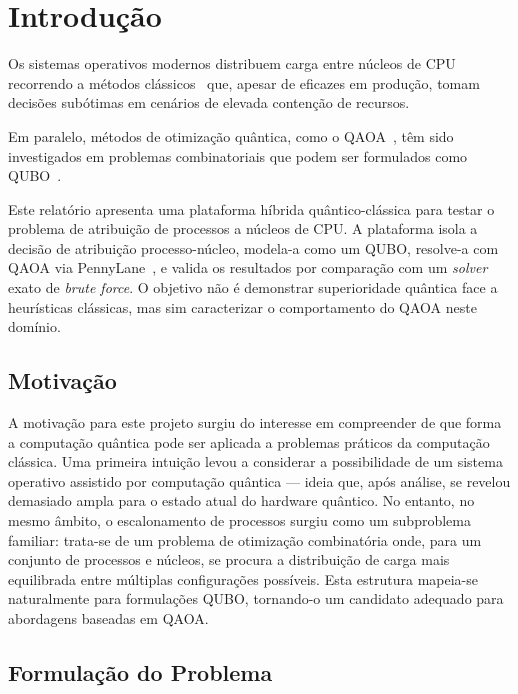 \chapter{Introdução}
\label{chap:introducao}

Os sistemas operativos modernos distribuem carga entre núcleos de \ac{CPU} recorrendo a métodos clássicos~\cite{LinuxCFS}
que, apesar de eficazes em produção, tomam decisões subótimas em cenários de elevada contenção de recursos.

Em paralelo, métodos de otimização quântica, como o \ac{QAOA}~\cite{Farhi2014QAOA},
têm sido investigados em problemas combinatoriais que podem ser formulados como
\ac{QUBO}~\cite{Kochenberger2014QUBO,Glover2019QUBO}.

Este relatório apresenta uma plataforma híbrida quântico-clássica para testar o problema
de atribuição de processos a núcleos de \acs{CPU}. A plataforma isola a decisão de atribuição processo-núcleo,
modela-a como um \acs{QUBO}, resolve-a com \acs{QAOA} via PennyLane~\cite{Bergholm2018PennyLane},
e valida os resultados por comparação com um \textit{solver} exato de \textit{brute force}.
O objetivo não é demonstrar superioridade quântica face a heurísticas clássicas, mas sim caracterizar o comportamento do \acs{QAOA} neste 
domínio.

\section{Motivação}
\label{sec:motivacao}
A motivação para este projeto surgiu do interesse em compreender de que forma a computação quântica pode ser aplicada a problemas práticos da computação clássica. Uma primeira intuição levou a considerar a possibilidade de um sistema operativo assistido por computação quântica --- ideia que, após análise, se revelou demasiado ampla para o estado atual do hardware quântico. No entanto, no mesmo âmbito, o escalonamento de processos surgiu como um subproblema familiar: trata-se de um problema de otimização combinatória onde, para um conjunto de processos e núcleos, se procura a distribuição de carga mais equilibrada entre múltiplas configurações possíveis. Esta estrutura mapeia-se naturalmente para formulações \acs{QUBO}, tornando-o um candidato adequado para abordagens baseadas em \acs{QAOA}.

\section{Formulação do Problema}
\label{sec:formulacao-problema}

